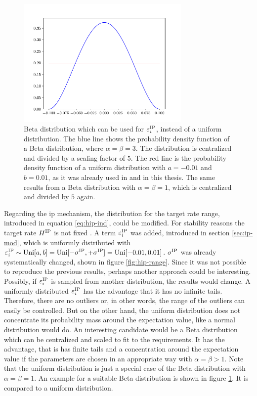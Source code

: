 \begin{figure}[!b]
	\centering
	\includegraphics[width=0.75\textwidth]{discussion/beta}
	\caption[Beta distribution]{Beta distribution which can be used for $\varepsilon_i^{\text{IP}}$, instead of a uniform distribution. The blue line shows the probability density function of a Beta distribution, where $\alpha = \beta = 3$. The distribution is centralized and divided by a scaling factor of $5$. The red line is the probability density function of a uniform distribution with $a = -0.01$ and $b = 0.01$, as it was already used in \textcite{hartmann2015s} and in this thesis. The same results from a Beta distribution with $\alpha = \beta = 1$, which is centralized and divided by $5$ again.}
	\label{fig:beta-dist}
\end{figure}

Regarding the \acs{ip} mechanism, the distribution for the target rate range, introduced in equation \eqref{eq:hip-ind}, could be modified. For stability reasons the target rate $H^{\text{IP}}$ is not fixed \parencite{hartmann2015s}. A term $\varepsilon_i^{\text{IP}}$ was added, introduced in section \ref{sec:ip-mod}, which is uniformly distributed with $\varepsilon_i^{\text{IP}} \sim \text{Uni}[a,b] = \text{Uni}[-\sigma^{\text{IP}},+\sigma^{\text{IP}}] = \text{Uni}[-0.01,0.01]$. $\sigma^{\text{IP}}$ was already systematically changed, shown in figure \ref{fig:hip-range}. Since it was not possible to reproduce the previous results, perhaps another approach could be interesting. Possibly, if $\varepsilon_i^{\text{IP}}$ is sampled from another distribution, the results would change. A uniformly distributed $\varepsilon_i^{\text{IP}}$ has the advantage that it has no infinite tails. Therefore, there are no outliers or, in other words, the range of the outliers can easily be controlled. But on the other hand, the uniform distribution does not concentrate its probability mass around the expectation value, like a normal distribution would do. An interesting candidate would be a Beta distribution which can be centralized and scaled to fit to the requirements. It has the advantage, that is has finite tails and a concentration around the expectation value if the parameters are chosen in an appropriate way with $\alpha = \beta > 1$. Note that the uniform distribution is just a special case of the Beta distribution with $\alpha = \beta = 1$. An example for a suitable Beta distribution is shown in figure \ref{fig:beta-dist}. It is compared to a uniform distribution.

